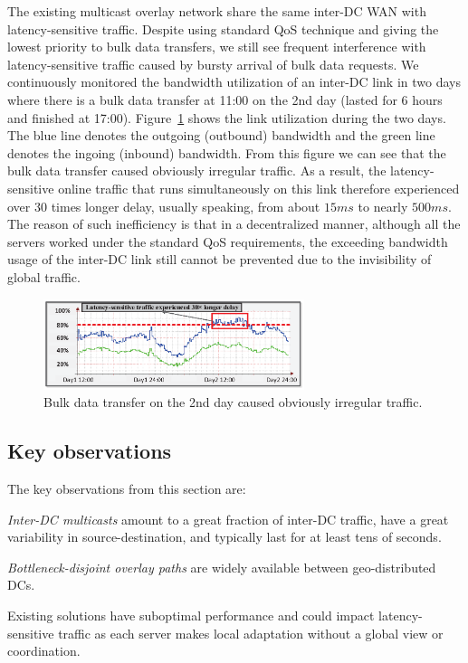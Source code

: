 The existing multicast overlay network share the same inter-DC WAN
with latency-sensitive traffic.
Despite using standard QoS technique and giving the lowest priority to
bulk data transfers, we still see frequent interference with
latency-sensitive traffic caused by bursty arrival of bulk data
requests.
We continuously monitored the bandwidth utilization of an inter-DC
link in two days where there is a bulk data transfer at 11:00 on the
2nd day (lasted for 6 hours and finished at 17:00).
Figure~\ref{fig:lesson2} shows the link utilization during the two
days. The blue line denotes the outgoing (outbound) bandwidth and the green line denotes the ingoing (inbound) bandwidth. From this figure we can see that the bulk data transfer caused
obviously irregular traffic. As a result, the latency-sensitive online
traffic that runs simultaneously on this link therefore experienced over
30 times longer delay, usually speaking,
from about $15ms$ to nearly $500ms$. The reason of such inefficiency is that in a decentralized manner, although all the servers worked under the standard QoS requirements, the exceeding bandwidth usage of the inter-DC link still cannot be prevented due to the invisibility of global traffic.


\begin{figure}[t]
        \center
        \includegraphics[width=3in]{images/nj02-M2A_0212-0216_v2.eps}
        \caption{Bulk data transfer on the 2nd day caused obviously irregular traffic.}
        \label{fig:lesson2}
\end{figure}

\subsection{Key observations}
The key observations from this section are:
\begin{packeditemize}
\item {\em Inter-DC multicasts} amount to a 
great fraction of inter-DC traffic, 
have a great variability in source-destination, and typically last for at
least tens of seconds.
\item {\em Bottleneck-disjoint overlay paths} are widely available 
between geo-distributed DCs.
\item Existing solutions have suboptimal performance and 
could impact latency-sensitive traffic as
each server makes local adaptation without a global view or coordination.
\end{packeditemize}

